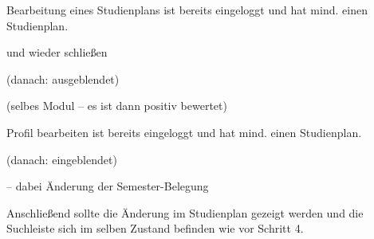 \begin{scenario*}{Bearbeitung eines Studienplans}
	{ ist bereits eingeloggt und hat mind. einen \gls{Studienplan}.}
	\item {}
	\item {} 
	\item {} und wieder schließen
	\item {}
	\item {}
	\item {} (danach: ausgeblendet)
	\item {}
	\item {}
	\item {} (selbes \gls{Modul} – es ist dann positiv bewertet) 
	\item {}
	\item {}
	\item {}
\end{scenario*}

\begin{scenario*}{Profil bearbeiten}
	{ ist bereits eingeloggt und hat mind. einen \gls{Studienplan}.}
	\item {}
	\item {} (danach: eingeblendet)
	\item {}
	\item {} – dabei Änderung der Semester-Belegung
	\item Anschließend sollte die Änderung im Studienplan gezeigt werden und die Suchleiste sich im selben Zustand befinden wie vor Schritt 4.
\end{scenario*}

